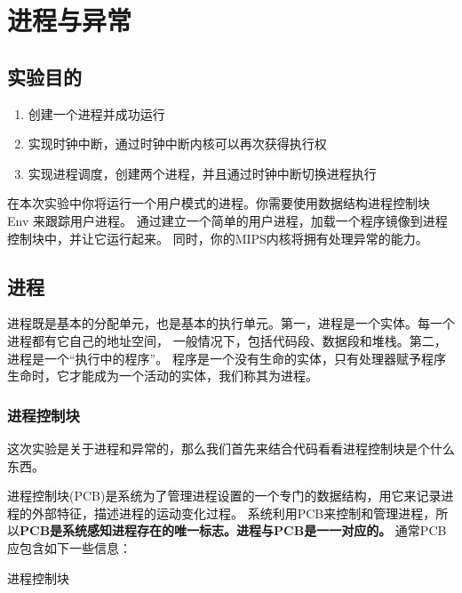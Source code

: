 \chapter{进程与异常}

\section{实验目的}
  \begin{enumerate}
    \item 创建一个进程并成功运行
    \item 实现时钟中断，通过时钟中断内核可以再次获得执行权
    \item 实现进程调度，创建两个进程，并且通过时钟中断切换进程执行
  \end{enumerate}

在本次实验中你将运行一个用户模式的进程。你需要使用数据结构进程控制块 Env 来跟踪用户进程。
通过建立一个简单的用户进程，加载一个程序镜像到进程控制块中，并让它运行起来。
同时，你的MIPS内核将拥有处理异常的能力。

\section{进程}

\begin{note}
进程既是基本的分配单元，也是基本的执行单元。第一，进程是一个实体。每一个进程都有它自己的地址空间，
一般情况下，包括代码段、数据段和堆栈。第二，进程是一个“执行中的程序”。
程序是一个没有生命的实体，只有处理器赋予程序生命时，它才能成为一个活动的实体，我们称其为进程。
\end{note}

\subsection{进程控制块}

这次实验是关于进程和异常的，那么我们首先来结合代码看看进程控制块是个什么东西。

进程控制块(PCB)是系统为了管理进程设置的一个专门的数据结构，用它来记录进程的外部特征，描述进程的运动变化过程。
系统利用PCB来控制和管理进程，所以\textbf{PCB是系统感知进程存在的唯一标志。进程与PCB是一一对应的。}
通常PCB应包含如下一些信息：

\begin{codeBoxWithCaption}{进程控制块\label{code:process_of_env.h}}
  \inputminted[linenos]{c}{codes/process_of_env.h}
\end{codeBoxWithCaption}

